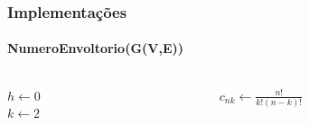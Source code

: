 \begin{frame}
\frametitle{Implementações}
\framesubtitle{NumeroEnvoltorio(G(V,E))}
  \begin{columns}[T]
    \begin{column}{.5\textwidth}
    \begin{algorithm}[H]
        \caption{$NumeroEnvoltorio(G(V,E))$}
        \SetAlFnt{\tiny}
        \SetAlCapFnt{\small}
        \SetAlCapNameFnt{\small}
        \SetAlgoLined
        \DontPrintSemicolon
        \LinesNumbered
        \SetAlgoLined
        \BlankLine
        \BlankLine
        $h \gets 0$\\
        $k \gets 2$\\
     \end{algorithm}
    \end{column}
    \begin{column}{.5\textwidth}
        \begin{algorithm}[H]
            \caption{$ConjuntoEnvoltoriaK(G(V,E),k)$}
            \label{alg:busca-conjunto-envoltoria-p3}
            \SetAlFnt{\tiny}
            \SetAlCapFnt{\small}
            \SetAlCapNameFnt{\small}
            \SetAlgoLined
            \DontPrintSemicolon
            \LinesNumbered
            \SetAlgoLined
            \BlankLine
            \BlankLine
            \BlankLine
            $c_{nk} \gets \frac{n!}{k!(n-k)!}$\\
        \end{algorithm}
    \end{column}
  \end{columns}
\end{frame}

